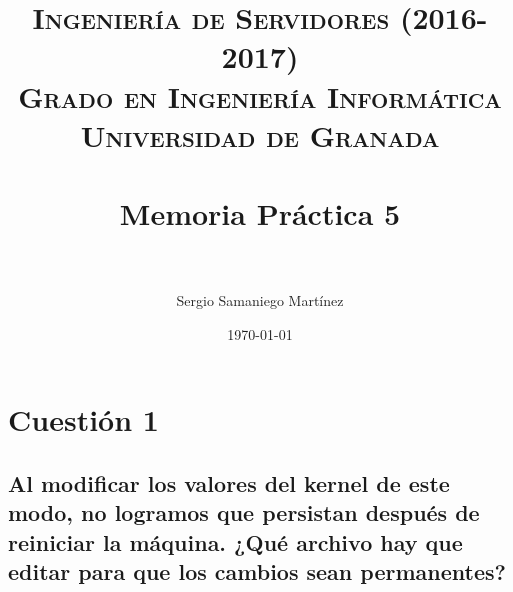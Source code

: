 


\title{	
\normalfont \normalsize 
\textsc{\textbf{Ingeniería de Servidores (2016-2017)} \\ Grado en Ingeniería Informática \\ Universidad de Granada} \\ [25pt] %
\horrule{0.5pt} \\[0.4cm] %
\huge Memoria Práctica 5 \\ %
\horrule{2pt} \\[0.5cm] %
}

\author{Sergio Samaniego Martínez} %

\date{\normalsize\today} %




\maketitle %

\newpage

\tableofcontents %

\newpage


\section{Cuestión 1}

\subsection{\Large Al modificar los valores del kernel de este modo, no logramos que persistan después de reiniciar la máquina. ¿Qué archivo hay que editar para que los cambios sean permanentes?}

